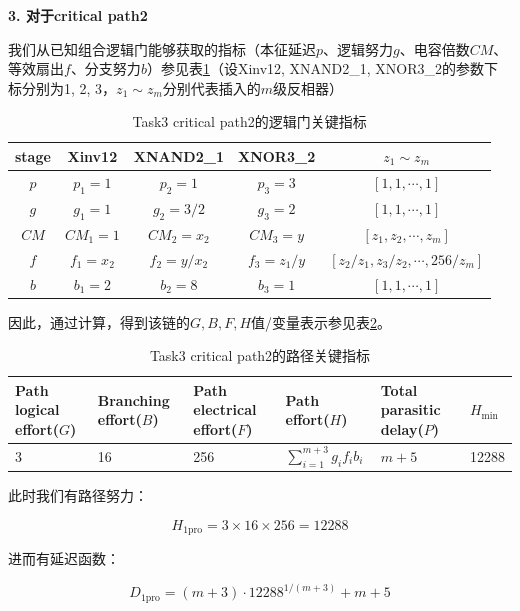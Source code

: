 \documentclass[UTF8,12pt,a4paper]{ctexart}
\begin{document}
\textbf{3. 对于critical path2}

我们从已知组合逻辑门能够获取的指标（本征延迟$p$、逻辑努力$g$、电容倍数$CM$、等效扇出$f$、分支努力$b$）参见表\ref{tab:task3_p2_metrics}（设Xinv12, XNAND2\_1, XNOR3\_2的参数下标分别为1, 2, 3，$z_1 \sim z_m$分别代表插入的$m$级反相器）

\begin{table}[htbp]
    \centering
    \caption{Task3 critical path2的逻辑门关键指标}
    \label{tab:task3_p2_metrics}
    \begin{tabular}{ccccc}
    \toprule
    stage & Xinv12 & XNAND2\_1 & XNOR3\_2 & $z_1 \sim z_m$ \\
    \midrule
    $p$ & $p_1 = 1$ & $p_2 = 1$ & $p_3 = 3$ & $[1,1,\cdots ,1]$ \\
    $g$ & $g_1 = 1$ & $g_2 = 3/2$ & $g_3 = 2$ & $[1,1,\cdots ,1]$ \\
    $CM$ & $CM_1 = 1$ & $CM_2 = x_2$ & $CM_3 = y$ & $[z_1, z_2, \cdots, z_m]$ \\
    $f$ & $f_1 = x_2$ & $f_2 = y/x_2$ & $f_3 = z_{1}/y$ & $[z_{2}/z_{1}, z_{3}/z_{2}, \cdots, 256/z_{m}]$ \\
    $b$ & $b_1 = 2$ & $b_2 = 8$ & $b_3 = 1$ & $[1,1,\cdots ,1]$ \\
    \bottomrule
    \end{tabular}
\end{table}

因此，通过计算，得到该链的$G,B,F,H$值/变量表示参见表\ref{tab:task3_p2_path_metrics}。

\begin{table}[htbp]
    \centering
    \caption{Task3 critical path2的路径关键指标}
    \label{tab:task3_p2_path_metrics}
    \begin{tabularx}{\linewidth}{XXXXXX}
    \toprule
    Path logical effort($G$) & Branching effort($B$) &
    Path electrical effort($F$) & Path effort($H$) &
    Total parasitic delay($P$) & $H_{\text{min}}$\\
    \midrule
    3 & 16 & 256 & $\sum_{i=1}^{m+3}{g_i f_i b_i}$ & $m+5$ & 12288\\
    \bottomrule
    \end{tabularx}
\end{table}

此时我们有路径努力：

$$H_{\text{1pro}} = 3 \times 16 \times 256 = 12288$$

进而有延迟函数：

$$D_{\text{1pro}} = (m+3) \cdot 12288^{1/(m+3)} + m + 5$$
\end{document}
